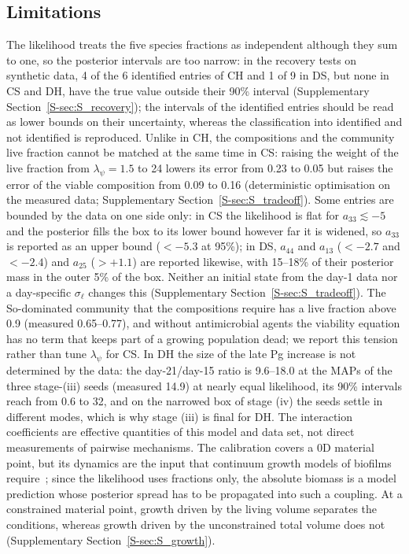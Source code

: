 \documentclass[preprint,12pt]{elsarticle}
\begin{document}
\subsection{Limitations}
\label{sec:limits}
The likelihood treats the five species fractions as independent although they sum to one, so the posterior intervals are too narrow: in the recovery tests on synthetic data, 4 of the 6 identified entries of CH and 1 of 9 in DS, but none in CS and DH, have the true value outside their 90\% interval (Supplementary Section~\ref{S-sec:S_recovery}); the intervals of the identified entries should be read as lower bounds on their uncertainty, whereas the classification into identified and not identified is reproduced.
Unlike in CH, the compositions and the community live fraction cannot be matched at the same time in CS: raising the weight of the live fraction from $\lambda_\psi=1.5$ to 24 lowers its error from 0.23 to 0.05 but raises the error of the viable composition from 0.09 to 0.16 (deterministic optimisation on the measured data; Supplementary Section~\ref{S-sec:S_tradeoff}).
Some entries are bounded by the data on one side only: in CS the likelihood is flat for $a_{33}\lesssim-5$ and the posterior fills the box to its lower bound however far it is widened, so $a_{33}$ is reported as an upper bound ($<-5.3$ at 95\%); in DS, $a_{44}$ and $a_{13}$ ($<-2.7$ and $<-2.4$) and $a_{25}$ ($>+1.1$) are reported likewise, with 15--18\% of their posterior mass in the outer 5\% of the box.
Neither an initial state from the day-1 data nor a day-specific $\sigma_\ell$ changes this (Supplementary Section~\ref{S-sec:S_tradeoff}).
The So-dominated community that the compositions require has a live fraction above 0.9 (measured 0.65--0.77), and without antimicrobial agents the viability equation has no term that keeps part of a growing population dead; we report this tension rather than tune $\lambda_\psi$ for CS.
In DH the size of the late Pg increase is not determined by the data: the day-21/day-15 ratio is 9.6--18.0 at the MAPs of the three stage-(iii) seeds (measured 14.9) at nearly equal likelihood, its 90\% intervals reach from 0.6 to 32, and on the narrowed box of stage (iv) the seeds settle in different modes, which is why stage (iii) is final for DH.
The interaction coefficients are effective quantities of this model and data set, not direct measurements of pairwise mechanisms.
The calibration covers a 0D material point, but its dynamics are the input that continuum growth models of biofilms require~\citep{Klempt2024ContinuumGrowth}; since the likelihood uses fractions only, the absolute biomass is a model prediction whose posterior spread has to be propagated into such a coupling. At a constrained material point, growth driven by the living volume separates the conditions, whereas growth driven by the unconstrained total volume does not (Supplementary Section~\ref{S-sec:S_growth}).
\end{document}
